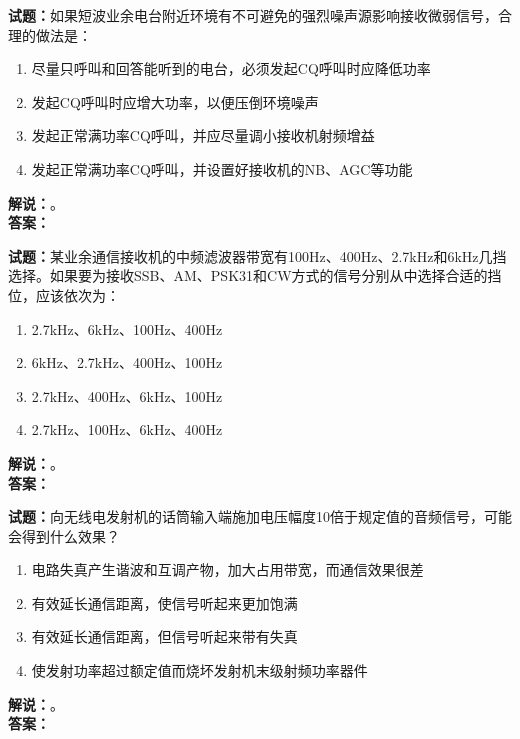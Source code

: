 \documentclass{ctexbook}
\begin{document}
\vspace{\baselineskip}

\noindent\textbf{试题：}如果短波业余电台附近环境有不可避免的强烈噪声源影响接收微弱信号，合理的做法是：
\begin{enumerate}[leftmargin=3em]
  \item 尽量只呼叫和回答能听到的电台，必须发起CQ呼叫时应降低功率
  \item 发起CQ呼叫时应增大功率，以便压倒环境噪声
  \item 发起正常满功率CQ呼叫，并应尽量调小接收机射频增益
  \item 发起正常满功率CQ呼叫，并设置好接收机的NB、AGC等功能
\end{enumerate}
\noindent\textbf{解说：}\textbf{}。\\\noindent\textbf{答案：}

\vspace{\baselineskip}

\noindent\textbf{试题：}某业余通信接收机的中频滤波器带宽有100Hz、400Hz、2.7\unit{\kHz}和6\unit{\kHz}几挡选择。如果要为接收SSB、AM、PSK31和CW方式的信号分别从中选择合适的挡位，应该依次为：
\begin{enumerate}[leftmargin=3em]
  \item 2.7\unit{\kHz}、6\unit{\kHz}、100Hz、400Hz
  \item 6\unit{\kHz}、2.7\unit{\kHz}、400Hz、100Hz
  \item 2.7\unit{\kHz}、400Hz、6\unit{\kHz}、100Hz
  \item 2.7\unit{\kHz}、100Hz、6\unit{\kHz}、400Hz
\end{enumerate}
\noindent\textbf{解说：}\textbf{}。\\\noindent\textbf{答案：}

\vspace{\baselineskip}

\noindent\textbf{试题：}向无线电发射机的话筒输入端施加电压幅度10倍于规定值的音频信号，可能会得到什么效果？
\begin{enumerate}[leftmargin=3em]
  \item 电路失真产生谐波和互调产物，加大占用带宽，而通信效果很差
  \item 有效延长通信距离，使信号听起来更加饱满
  \item 有效延长通信距离，但信号听起来带有失真
  \item 使发射功率超过额定值而烧坏发射机末级射频功率器件
\end{enumerate}
\noindent\textbf{解说：}\textbf{}。\\\noindent\textbf{答案：}
\end{document}

